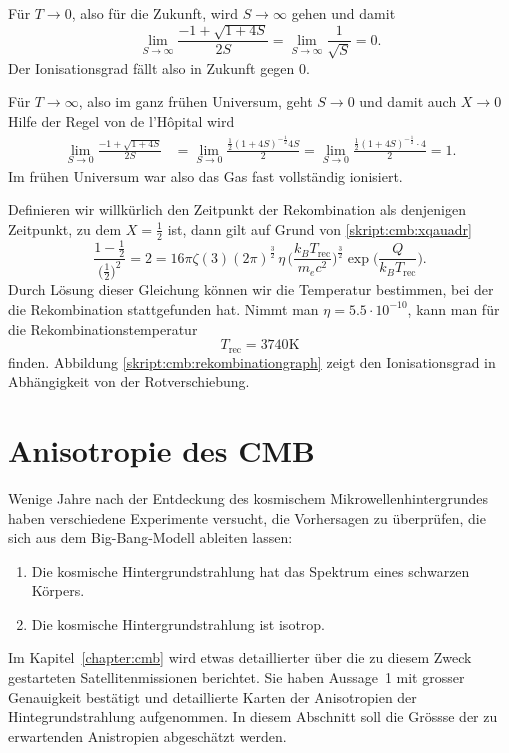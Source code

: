 Für $T\to 0$, also für die Zukunft, wird $S\to \infty$ gehen
und damit
\[
\lim_{S\to\infty}\frac{-1+\sqrt{1+4S}}{2S}
=
\lim_{S\to\infty}\frac{1}{\sqrt{S}}
=
0.
\]
Der Ionisationsgrad fällt also in Zukunft gegen 0.

Für $T\to\infty$, also im ganz frühen Universum, geht $S\to 0$
und damit auch $X\to 0$
Hilfe der Regel von de l'H\^opital wird
\begin{align*}
\lim_{S\to 0}\frac{-1+\sqrt{1+4S}}{2S}
&=
\lim_{S\to 0}
\frac{\frac12(1+4S)^{-\frac12} 4S}{2}
=
\lim_{S\to 0}
\frac{\frac12(1+4S)^{-\frac12}\cdot 4}{2}
=
1.
\end{align*}
Im frühen Universum war also das Gas fast vollständig ionisiert.

Definieren wir willkürlich den Zeitpunkt der Rekombination als
denjenigen Zeitpunkt, zu dem $X=\frac12$ ist, dann gilt auf Grund
von \eqref{skript:cmb:xqauadr}
\[
\frac{1-\frac12}{\bigl(\frac12\bigr)^2}
=
2
=
16\pi\zeta(3)(2\pi)^{\frac32}
\,
\eta
\,
\biggl(\frac{k_BT_\text{rec}}{m_ec^2}\biggr)^{\frac32}
\exp\biggl( \frac{Q}{k_BT_\text{rec}} \biggr).
\]
Durch Lösung dieser Gleichung können wir die Temperatur bestimmen,
bei der die Rekombination stattgefunden hat.
Nimmt man $\eta=5.5\cdot 10^{-10}$, kann man für die Rekombinationstemperatur
\[
T_\text{rec} = 3740\text{K}
\]
finden.
Abbildung \ref{skript:cmb:rekombinationgraph} zeigt den Ionisationsgrad
in Abhängigkeit von der Rotverschiebung.

\section{Anisotropie des CMB}
Wenige Jahre nach der Entdeckung des kosmischem Mikrowellenhintergrundes
haben verschiedene Experimente versucht, die Vorhersagen zu überprüfen,
die sich aus dem Big-Bang-Modell ableiten lassen:
\begin{enumerate}
\item Die kosmische Hintergrundstrahlung hat das Spektrum eines schwarzen
Körpers.
\item Die kosmische Hintergrundstrahlung ist isotrop.
\end{enumerate}
Im Kapitel~\ref{chapter:cmb} wird etwas detaillierter über die zu diesem
Zweck gestarteten Satellitenmissionen berichtet.
Sie haben Aussage~1 mit grosser Genauigkeit bestätigt und detaillierte
Karten der Anisotropien der Hintegrundstrahlung aufgenommen.
In diesem Abschnitt soll die Grössse der zu erwartenden Anistropien
abgeschätzt werden.

